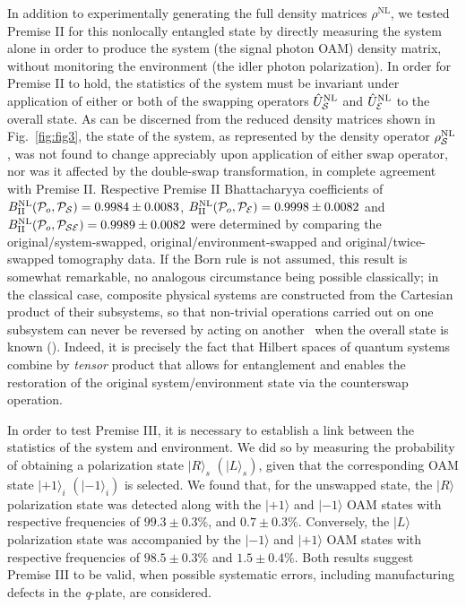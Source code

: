 \documentclass[12pt]{iopart}
\begin{document}
In addition to experimentally generating the full density matrices $\rho^\mathrm{NL}$, we tested Premise II for this nonlocally entangled state by directly measuring the system alone in order to produce the system (the signal photon OAM) density matrix, without monitoring the environment (the idler photon polarization). In order for Premise II to hold, the statistics of the system must be invariant under application of either or both of the swapping operators $\hat{U}_{\cal S}^\mathrm{NL}$ and $\hat{U}_{\cal E}^\mathrm{NL}$ to the overall state. As can be discerned from the reduced density matrices shown in Fig.~\ref{fig:fig3}, the state of the system, as represented by the density operator $\rho_{\cal S}^\mathrm{NL}$, was not found to change appreciably upon application of either swap operator, nor was it affected by the double-swap transformation, in complete agreement with Premise II. Respective Premise II Bhattacharyya coefficients of $B^\mathrm{NL}_\mathrm{II}({\cal P}_{o},{\cal P}_{\cal S})=0.9984\pm0.0083$, $B^\mathrm{NL}_\mathrm{II}({\cal P}_{o},{\cal P}_{\cal E})=0.9998\pm0.0082$ and $B^\mathrm{NL}_\mathrm{II}({\cal P}_{o},{\cal P}_{{\cal SE}})=0.9989\pm0.0082$ were determined by comparing the original/system-swapped, original/environment-swapped and original/twice-swapped tomography data. If the Born rule is not assumed, this result is somewhat remarkable, no analogous circumstance being possible classically; in the classical case, composite physical systems are constructed from the Cartesian product of their subsystems, so that non-trivial operations carried out on one subsystem can never be reversed by acting on another~\cite{zurek:05} when the overall state is known (). Indeed, it is precisely the fact that Hilbert spaces of quantum systems combine by \textit{tensor} product that allows for entanglement and enables the restoration of the original system/environment state via the counterswap operation. 

In order to test Premise III, it is necessary to establish a link between the statistics of the system and environment. We did so by measuring the probability of obtaining a polarization state $|R\rangle_s$ $\left(|L\rangle_s\right)$, given that the corresponding OAM state $|+1\rangle_i$ $\left(|-1\rangle_i\right)$ is selected. We found that, for the unswapped state, the $|R\rangle$ polarization state was detected along with the $|+1\rangle$ and $|-1\rangle$ OAM states with respective frequencies of $99.3\pm0.3\%$, and $0.7\pm0.3\%$. Conversely, the $|L\rangle$ polarization state was accompanied by the $|-1\rangle$ and $|+1\rangle$ OAM states with respective frequencies of $98.5\pm0.3\%$ and $1.5\pm0.4\%$. Both results suggest Premise III to be valid, when possible systematic errors, including manufacturing defects in the \textit{q}-plate, are considered.
\end{document}
